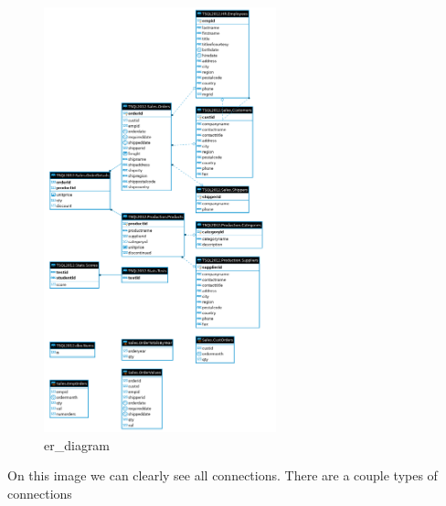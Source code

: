 \documentclass[a4paper]{article}
\begin{document}
\subsection{}
\begin{figure}[htpb]
    \centering
    \includegraphics[width=0.6\textwidth]{er_diagram}
    \caption{er\_diagram}
    \label{fig:er_diagram}
\end{figure}
\clearpage
On this image we can clearly see all connections. There are a couple types of connections
\end{document}
